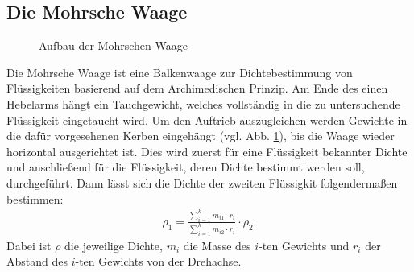 \subsection{Die Mohrsche Waage}
%
\begin{figure}[!htbp]
\centering
\resizebox{0.5\textwidth}{!}{}
\caption{Aufbau der Mohrschen Waage \cite{LP:Online}}
\label{img:mohrsche}
\end{figure}
%
Die Mohrsche Waage ist eine Balkenwaage zur Dichtebestimmung von Flüssigkeiten basierend auf dem Archimedischen Prinzip. Am Ende des einen Hebelarms hängt ein Tauchgewicht, welches vollständig in die zu untersuchende Flüssigkeit eingetaucht wird. Um den Auftrieb auszugleichen werden Gewichte in die dafür vorgesehenen Kerben eingehängt (vgl. Abb. \ref{img:mohrsche}), bis die Waage wieder horizontal ausgerichtet ist. Dies wird zuerst für eine Flüssigkeit bekannter Dichte und anschließend für die Flüssigkeit, deren Dichte bestimmt werden soll, durchgeführt. Dann lässt sich die Dichte der zweiten Flüssigkit folgendermaßen bestimmen:\cite{LP:Online}
%
\begin{align}
	\rho_1 = \frac{\sum_{i=1}^{k}m_{i1} \cdot r_i}{\sum_{i=1}^{k}m_{i2} \cdot r_i} \cdot \rho_2.
	\label{eq:mohrsche}
\end{align}
%
Dabei ist $\rho$ die jeweilige Dichte, $m_i$ die Masse des $i$-ten Gewichts und $r_i$ der Abstand des $i$-ten Gewichts von  der Drehachse.